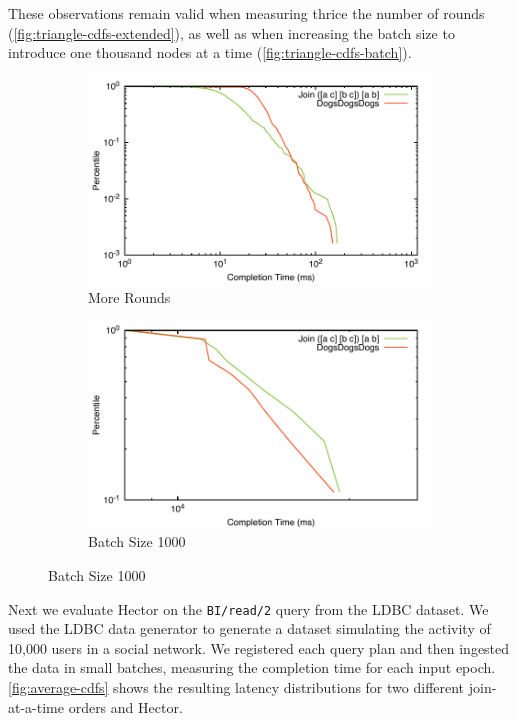 \documentclass[../catalog.tex]{subfiles}
\begin{document}
These observations remain valid when measuring thrice the number of
rounds (\autoref{fig:triangle-cdfs-extended}), as well as when
increasing the batch size to introduce one thousand nodes at a time
(\autoref{fig:triangle-cdfs-batch}).

\begin{figure}[h!]
  \begin{subfigure}{.5\textwidth}
    \includegraphics[width=1.0\linewidth]{results/triangles/out/extended_cdf}
    \caption{More Rounds}
    \label{fig:triangle-cdfs-extended}
  \end{subfigure}
  \begin{subfigure}{.5\textwidth}
    \includegraphics[width=1.0\linewidth]{results/triangles/out/batch_cdf}
    \caption{Batch Size 1000}
    \label{fig:triangle-cdfs-batch}
  \end{subfigure}
\end{figure}

Next we evaluate Hector on the \texttt{BI/read/2} query from the LDBC
dataset. We used the LDBC data generator to generate a dataset
simulating the activity of 10,000 users in a social network. We
registered each query plan and then ingested the data in small
batches, measuring the completion time for each input
epoch. \autoref{fig:average-cdfs} shows the resulting latency
distributions for two different join-at-a-time orders and Hector.
\end{document}
